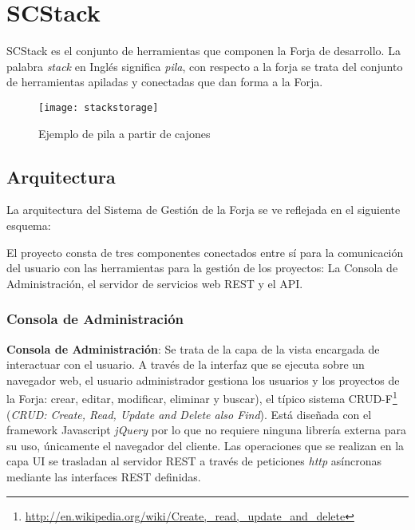 \chapter{SCStack}
\label{chap:scstack}

\par SCStack es el conjunto de herramientas que componen la Forja de desarrollo. La palabra \emph{stack} en Inglés significa \emph{pila}, con respecto a la forja se trata del conjunto de herramientas apiladas y conectadas que dan forma a la Forja.

\begin{figure}[H]
    \centering
    \texttt{[image: stackstorage]}
    \caption{Ejemplo de pila a partir de cajones}
    \label{fig:stackstorage}
\end{figure}

\section{Arquitectura}
\label{sec:arquitectura}

\par La arquitectura del Sistema de Gestión de la Forja se ve reflejada en el siguiente esquema:


\par El proyecto consta de tres componentes conectados entre sí para la comunicación del usuario con las herramientas para la gestión de los proyectos: La Consola de Administración, el servidor de servicios web REST y el API.

\subsection{Consola de Administración}
\label{sub:consola-admin}

\par \textbf{Consola de Administración}: Se trata de la capa de la vista encargada de interactuar con el usuario. A través de la interfaz que se ejecuta sobre un navegador web, el usuario administrador gestiona los usuarios y los proyectos de la Forja: crear, editar, modificar, eliminar y buscar), el típico sistema CRUD-F\footnote{\url{http://en.wikipedia.org/wiki/Create,\_read,\_update\_and\_delete}} (\emph{CRUD: Create, Read, Update and Delete also Find}). Está diseñada con el framework Javascript \emph{jQuery} por lo que no requiere ninguna librería externa para su uso, únicamente el navegador del cliente. Las operaciones que se realizan en la capa UI se trasladan al servidor REST a través de peticiones \emph{http} asíncronas mediante las interfaces REST definidas.


